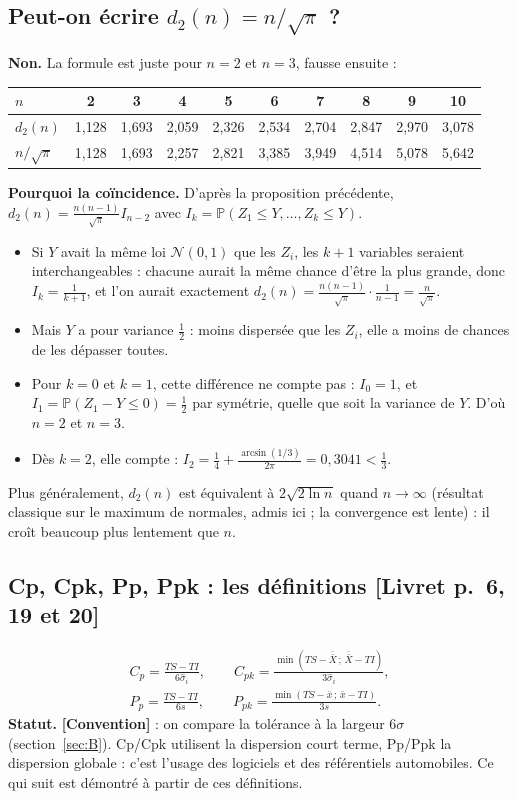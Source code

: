 \documentclass[11pt,a4paper]{article}
\theoremstyle{tq}
\theoremstyle{remark}
\newcommand{\conv}{\textcolor{orangeTQ}{\textbf{[Convention]}}}
\newcommand{\liv}[1]{\textcolor{uimmblue}{\small[Livret p.~#1]}}
\renewcommand{\P}{\mathbb{P}}
\newcommand{\N}{\mathcal{N}}
\newcommand{\Xbb}{\bar{\bar{X}}}
\begin{document}
\subsection{Peut-on écrire $d_2(n)=n/\sqrt\pi$ ?}
\textbf{Non.} La formule est juste pour $n=2$ et $n=3$, fausse ensuite :
\begin{center}\small
\begin{tabular}{@{}lccccccccc@{}}
\toprule
$n$ & 2 & 3 & 4 & 5 & 6 & 7 & 8 & 9 & 10\\
\midrule
$d_2(n)$ & 1,128 & 1,693 & 2,059 & 2,326 & 2,534 & 2,704 & 2,847 & 2,970 & 3,078\\
$n/\sqrt\pi$ & 1,128 & 1,693 & 2,257 & 2,821 & 3,385 & 3,949 & 4,514 & 5,078 & 5,642\\
\bottomrule
\end{tabular}
\end{center}
\textbf{Pourquoi la coïncidence.} D'après la proposition précédente, $d_2(n)=\frac{n(n-1)}{\sqrt\pi}I_{n-2}$ avec $I_k=\P(Z_1\le Y,\dots,Z_k\le Y)$.
\begin{itemize}[nosep,leftmargin=1.2em]
\item Si $Y$ avait la même loi $\N(0,1)$ que les $Z_i$, les $k+1$ variables seraient interchangeables : chacune aurait la même chance d'être la plus grande, donc $I_k=\frac{1}{k+1}$, et l'on aurait exactement $d_2(n)=\frac{n(n-1)}{\sqrt\pi}\cdot\frac1{n-1}=\frac{n}{\sqrt\pi}$.
\item Mais $Y$ a pour variance $\frac12$ : moins dispersée que les $Z_i$, elle a moins de chances de les dépasser toutes.
\item Pour $k=0$ et $k=1$, cette différence ne compte pas : $I_0=1$, et $I_1=\P(Z_1-Y\le0)=\frac12$ par symétrie, quelle que soit la variance de $Y$. D'où $n=2$ et $n=3$.
\item Dès $k=2$, elle compte : $I_2=\frac14+\frac{\arcsin(1/3)}{2\pi}=0{,}3041<\frac13$.
\end{itemize}
Plus généralement, $d_2(n)$ est équivalent à $2\sqrt{2\ln n}$ quand $n\to\infty$ (résultat classique sur le maximum de normales, admis ici ; la convergence est lente) : il croît beaucoup plus lentement que $n$.

\subsection{Cp, Cpk, Pp, Ppk : les définitions \liv{6, 19 et 20}}
\begin{gather*}
C_p=\frac{TS-TI}{6\hat\sigma_i},\qquad C_{pk}=\frac{\min(TS-\Xbb\,;\,\Xbb-TI)}{3\hat\sigma_i},\\
P_p=\frac{TS-TI}{6s},\qquad P_{pk}=\frac{\min(TS-\bar x\,;\,\bar x-TI)}{3s}.
\end{gather*}
\textbf{Statut.} \conv{} : on compare la tolérance à la largeur $6\sigma$ (section~\ref{sec:B}). Cp/Cpk utilisent la dispersion court terme, Pp/Ppk la dispersion globale : c'est l'usage des logiciels et des référentiels automobiles. Ce qui suit est démontré à partir de ces définitions.
\end{document}
